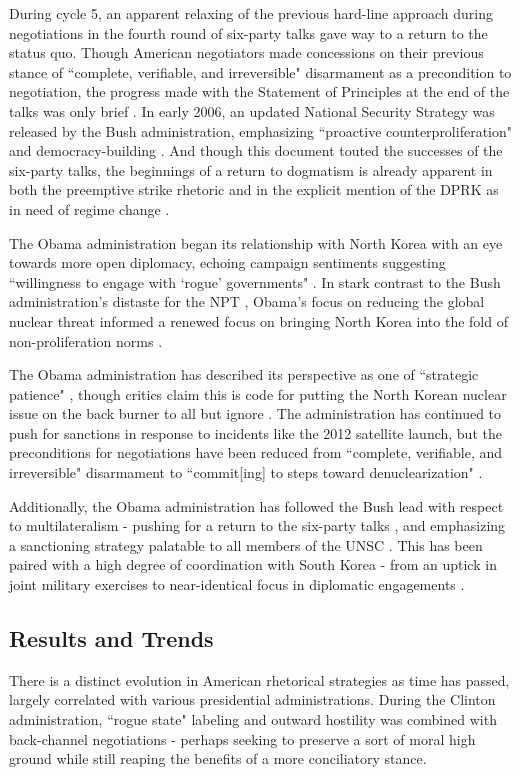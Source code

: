 During cycle 5, an apparent relaxing of the previous hard-line approach during negotiations in the fourth round of six-party talks gave way to a return to the status quo. Though American negotiators made concessions on their previous stance of ``complete, verifiable, and irreversible" disarmament as a precondition to negotiation, the progress made with the Statement of Principles at the end of the talks was only brief \cite{huntley}. In early 2006, an updated National Security Strategy was released by the Bush administration, emphasizing ``proactive counterproliferation" and democracy-building \cite{nss06}. And though this document touted the successes of the six-party talks, the beginnings of a return to dogmatism is already apparent in both the preemptive strike rhetoric and in the explicit mention of the DPRK as in need of regime change \cite{nss06}.

The Obama administration began its relationship with North Korea with an eye towards more open diplomacy, echoing campaign sentiments suggesting ``willingness to engage with `rogue' governments" \cite{crs13}. In stark contrast to the Bush administration's distaste for the NPT \cite{huntley}, Obama's focus on reducing the global nuclear threat informed a renewed focus on bringing North Korea into the fold of non-proliferation norms \cite{crs13}.

The Obama administration has described its perspective as one of ``strategic patience" \cite{crs13}, though critics claim this is code for putting the North Korean nuclear issue on the back burner to all but ignore \cite{green}. The administration has continued to push for sanctions in response to incidents like the 2012 satellite launch, but the preconditions for negotiations have been reduced from ``complete, verifiable, and irreversible" disarmament \cite{huntley} to ``commit[ing] to steps toward denuclearization" \cite{crs13}.

Additionally, the Obama administration has followed the Bush lead with respect to multilateralism - pushing for a return to the six-party talks \cite{crs13}, and emphasizing a sanctioning strategy palatable to all members of the UNSC \cite{green}. This has been paired with a high degree of coordination with South Korea - from an uptick in joint military exercises to near-identical focus in diplomatic engagements \cite{crs13}.

\subsection{Results and Trends}
There is a distinct evolution in American rhetorical strategies as time has passed, largely correlated with various presidential administrations. During the Clinton administration, ``rogue state" labeling and outward hostility was combined with back-channel negotiations - perhaps seeking to preserve a sort of moral high ground while still reaping the benefits of a more conciliatory stance.

